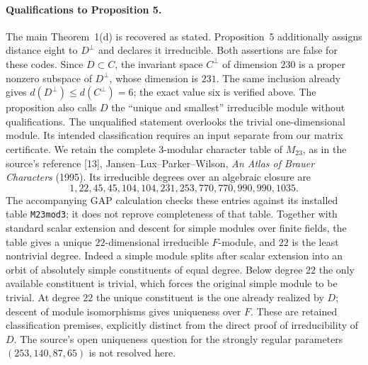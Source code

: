 \paragraph{Qualifications to Proposition 5.}
The main Theorem~1(d) is recovered as stated. Proposition~5 additionally
assigns distance eight to $D^\perp$ and declares it irreducible. Both
assertions are false for these codes. Since $D\subset C$, the invariant
space $C^\perp$ of dimension $230$ is a proper nonzero subspace of
$D^\perp$, whose dimension is $231$. The same inclusion already gives
$d(D^\perp)\leq d(C^\perp)=6$; the exact value six is verified above.
The proposition also calls $D$ the ``unique and smallest'' irreducible
module without qualifications. The unqualified statement overlooks the
trivial one-dimensional module. Its intended classification requires an
input separate from our matrix certificate. We retain the complete
$3$-modular character table of $M_{23}$, as in the source's reference [13],
Jansen--Lux--Parker--Wilson, \emph{An Atlas of Brauer Characters} (1995).
Its irreducible degrees over an algebraic closure are
\[
 1,22,45,45,104,104,231,253,770,770,990,990,1035.
\]
The accompanying GAP calculation checks these entries against its
installed table \texttt{M23mod3}; it does not reprove completeness of
that table. Together with standard scalar extension and descent for
simple modules over finite fields, the table gives a unique
$22$-dimensional irreducible $F$-module, and $22$ is the least
nontrivial degree. Indeed a simple module splits after scalar extension
into an orbit of absolutely simple constituents of equal degree. Below
degree $22$ the only available constituent is trivial, which forces the
original simple module to be trivial. At degree $22$ the unique
constituent is the one already realized by $D$; descent of module
isomorphisms gives uniqueness over $F$. These are retained
classification premises, explicitly distinct from the direct proof of
irreducibility of $D$. The source's open uniqueness question for the
strongly regular parameters $(253,140,87,65)$ is not resolved here.

